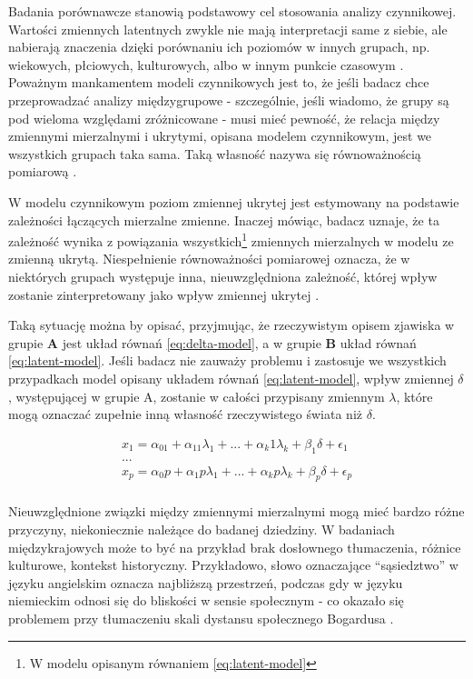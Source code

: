 \documentclass[12pt]{article}
\begin{document}
Badania porównawcze stanowią podstawowy cel stosowania analizy czynnikowej. Wartości zmiennych latentnych zwykle nie mają interpretacji same z siebie, ale nabierają znaczenia dzięki porównaniu ich poziomów w innych grupach, np. wiekowych, płciowych, kulturowych, albo w innym punkcie czasowym \citep{Pokropek}. Poważnym mankamentem modeli czynnikowych jest to, że jeśli badacz chce przeprowadzać analizy międzygrupowe - szczególnie, jeśli wiadomo, że grupy są pod wieloma względami zróżnicowane - musi mieć pewność, że relacja między zmiennymi mierzalnymi i ukrytymi, opisana modelem czynnikowym, jest we wszystkich grupach taka sama. Taką własność nazywa się równoważnością pomiarową \citep{ChenEtAl}.

W modelu czynnikowym poziom zmiennej ukrytej jest estymowany na podstawie zależności łączących mierzalne zmienne. Inaczej mówiąc, badacz uznaje, że ta zależność wynika z powiązania wszystkich\footnote{W modelu opisanym równaniem \ref{eq:latent-model}} zmiennych mierzalnych w modelu ze zmienną ukrytą. Niespełnienie równoważności pomiarowej oznacza, że w niektórych grupach występuje inna, nieuwzględniona zależność, której wpływ zostanie zinterpretowany jako wpływ zmiennej ukrytej \citep{HirBra}.

Taką sytuację można by opisać, przyjmując, że rzeczywistym opisem zjawiska w grupie \textbf{A} jest układ równań \ref{eq:delta-model}, a w grupie \textbf{B} układ równań \ref{eq:latent-model}. Jeśli badacz nie zauważy problemu i zastosuje we wszystkich przypadkach model opisany układem równań \ref{eq:latent-model}, wpływ zmiennej \(\delta\), występującej w grupie A, zostanie w całości przypisany zmiennym \(\lambda\), które mogą oznaczać zupełnie inną własność rzeczywistego świata niż \(\delta\).

\begin{equation}
\label{eq:delta-model}
\begin{aligned} 
x_1 = \alpha_01 + \alpha_11 \lambda_1 + ... + \alpha_k1 \lambda_k + \beta_1 \delta + \epsilon_1\\
...\\
x_p = \alpha_0p + \alpha_1p \lambda_1 + ... + \alpha_kp \lambda_k + \beta_p \delta + \epsilon_p\\
\end{aligned}
\end{equation}

Nieuwzględnione związki między zmiennymi mierzalnymi mogą mieć bardzo różne przyczyny, niekoniecznie należące do badanej dziedziny. W badaniach międzykrajowych może to być na przykład brak dosłownego tłumaczenia, różnice kulturowe, kontekst historyczny. Przykładowo, słowo oznaczające ``sąsiedztwo'' w języku angielskim oznacza najbliższą przestrzeń, podczas gdy w języku niemieckim odnosi się do bliskości w sensie społecznym - co okazało się problemem przy tłumaczeniu skali dystansu społecznego Bogardusa \citep{Pokropek}.
\end{document}
